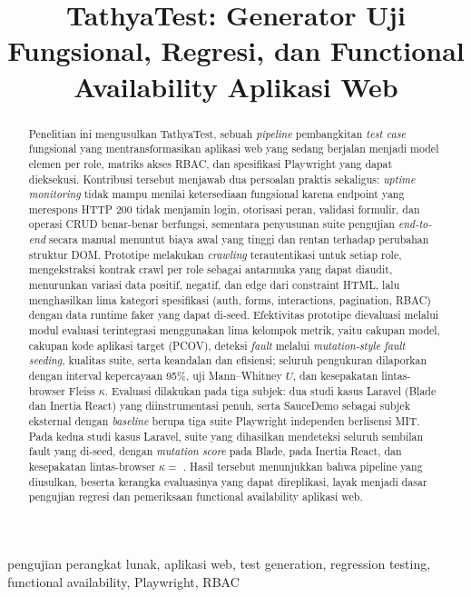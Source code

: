 \documentclass[conference]{IEEEtran}
\title{TathyaTest: Generator Uji Fungsional, Regresi, dan Functional Availability Aplikasi Web}
\author{%
\IEEEauthorblockN{Nama Penulis Pertama\IEEEauthorrefmark{1}, Nama Penulis Kedua\IEEEauthorrefmark{2}}
\IEEEauthorblockA{\IEEEauthorrefmark{1}Program Studi ..., Institusi ..., Kota, Indonesia\\
Email: penulis1@example.ac.id}
\IEEEauthorblockA{\IEEEauthorrefmark{2}Program Studi ..., Institusi ..., Kota, Indonesia\\
Email: penulis2@example.ac.id}
}
\begin{document}
\maketitle

\begin{abstract}
Penelitian ini mengusulkan TathyaTest, sebuah \textit{pipeline} pembangkitan \textit{test case} fungsional yang mentransformasikan aplikasi web yang sedang berjalan menjadi model elemen per role, matriks akses RBAC, dan spesifikasi Playwright yang dapat dieksekusi. Kontribusi tersebut menjawab dua persoalan praktis sekaligus: \textit{uptime monitoring} tidak mampu menilai ketersediaan fungsional karena endpoint yang merespons HTTP 200 tidak menjamin login, otorisasi peran, validasi formulir, dan operasi CRUD benar-benar berfungsi, sementara penyusunan suite pengujian \textit{end-to-end} secara manual menuntut biaya awal yang tinggi dan rentan terhadap perubahan struktur DOM. Prototipe melakukan \textit{crawling} terautentikasi untuk setiap role, mengekstraksi kontrak crawl per role sebagai antarmuka yang dapat diaudit, menurunkan variasi data positif, negatif, dan edge dari constraint HTML, lalu menghasilkan lima kategori spesifikasi (auth, forms, interactions, pagination, RBAC) dengan data runtime faker yang dapat di-seed. Efektivitas prototipe dievaluasi melalui modul evaluasi terintegrasi menggunakan lima kelompok metrik, yaitu cakupan model, cakupan kode aplikasi target (PCOV), deteksi \textit{fault} melalui \textit{mutation-style fault seeding}, kualitas suite, serta keandalan dan efisiensi; seluruh pengukuran dilaporkan dengan interval kepercayaan 95\%, uji Mann--Whitney $U$, dan kesepakatan lintas-browser Fleiss $\kappa$. Evaluasi dilakukan pada tiga subjek: dua studi kasus Laravel (Blade dan Inertia React) yang diinstrumentasi penuh, serta SauceDemo sebagai subjek eksternal dengan \textit{baseline} berupa tiga suite Playwright independen berlisensi MIT. Pada kedua studi kasus Laravel, suite yang dihasilkan mendeteksi seluruh sembilan fault yang di-seed, dengan \textit{mutation score} \evBladeMutScore{} pada Blade, \evInertiaMutScore{} pada Inertia React, dan kesepakatan lintas-browser $\kappa=$ \evBladeKappa. Hasil tersebut menunjukkan bahwa pipeline yang diusulkan, beserta kerangka evaluasinya yang dapat direplikasi, layak menjadi dasar pengujian regresi dan pemeriksaan functional availability aplikasi web.
\end{abstract}

\begin{IEEEkeywords}
pengujian perangkat lunak, aplikasi web, test generation, regression testing, functional availability, Playwright, RBAC
\end{IEEEkeywords}
\end{document}
